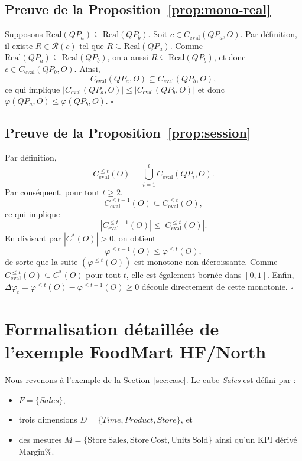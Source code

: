 \documentclass[journal]{IEEEtran}
\begin{document}
\subsection*{Preuve de la Proposition~\ref{prop:mono-real}}

Supposons $\mathrm{Real}(QP_a)\subseteq \mathrm{Real}(QP_b)$. Soit $c\in C_{\mathrm{eval}}(QP_a,O)$. Par définition, il existe $R\in\mathcal{R}(c)$ tel que $R\subseteq \mathrm{Real}(QP_a)$. Comme $\mathrm{Real}(QP_a)\subseteq \mathrm{Real}(QP_b)$, on a aussi $R\subseteq \mathrm{Real}(QP_b)$, et donc $c\in C_{\mathrm{eval}}(QP_b,O)$. Ainsi,
\[
C_{\mathrm{eval}}(QP_a,O)\subseteq C_{\mathrm{eval}}(QP_b,O),
\]
ce qui implique $|C_{\mathrm{eval}}(QP_a,O)|\le |C_{\mathrm{eval}}(QP_b,O)|$ et donc $\varphi(QP_a,O)\le \varphi(QP_b,O)$. \hfill$\square$

\subsection*{Preuve de la Proposition~\ref{prop:session}}

Par définition,
\[
C_{\mathrm{eval}}^{\le t}(O)=\bigcup_{i=1}^{t} C_{\mathrm{eval}}(QP_i,O).
\]
Par conséquent, pour tout $t\ge 2$,
\[
C_{\mathrm{eval}}^{\le t-1}(O)\subseteq C_{\mathrm{eval}}^{\le t}(O),
\]
ce qui implique
\[
|C_{\mathrm{eval}}^{\le t-1}(O)|\le |C_{\mathrm{eval}}^{\le t}(O)|.
\]
En divisant par $|C^*(O)|>0$, on obtient
\[
\varphi^{\le t-1}(O)\le \varphi^{\le t}(O),
\]
de sorte que la suite $(\varphi^{\le t}(O))$ est monotone non décroissante. Comme $C_{\mathrm{eval}}^{\le t}(O)\subseteq C^*(O)$ pour tout $t$, elle est également bornée dans $[0,1]$. Enfin, $\Delta\varphi_t=\varphi^{\le t}(O)-\varphi^{\le t-1}(O)\ge 0$ découle directement de cette monotonie. \hfill$\square$

\section{Formalisation détaillée de l'exemple FoodMart HF/North}
\label{app:foodmart}

Nous revenons à l'exemple de la Section~\ref{sec:case}. Le cube \textit{Sales} est défini par :
\begin{itemize}
  \item $F=\{\textit{Sales}\}$,
  \item trois dimensions $D=\{\textit{Time},\textit{Product},\textit{Store}\}$, et
  \item des mesures $M=\{\mathrm{Store\ Sales},\mathrm{Store\ Cost},\mathrm{Units\ Sold}\}$ ainsi qu'un KPI dérivé $\mathrm{Margin\%}$.
\end{itemize}
\end{document}
